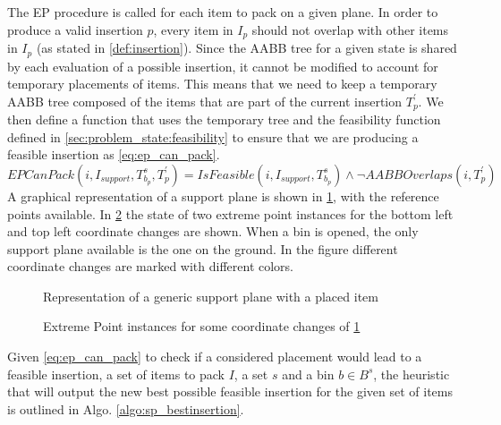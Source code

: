 The EP procedure is called for each item to pack on a given plane.
In order to produce a valid insertion $p$, every item in $I_p$ should not overlap with other items in $I_p$ (as stated in \cref{def:insertion}).
Since the AABB tree for a given state is shared by each evaluation of a possible insertion, it cannot be modified to account for temporary placements of items.
This means that we need to keep a temporary AABB tree composed of the items that are part of the current insertion $T^\prime_p$.
We then define a function that uses the temporary tree and the feasibility function defined in \cref{sec:problem_state:feasibility} to ensure that we are producing a feasible insertion as \cref{eq:ep_can_pack}.
\begin{equation}
    \label{eq:ep_can_pack}
    EPCanPack(i, I_{support}, T^s_{b_p}, T^\prime_p) = IsFeasible(i, I_{support}, T^s_{b_p}) \land \lnot AABBOverlaps(i, T^\prime_p)
\end{equation}
A graphical representation of a support plane is shown in \cref{fig:support_planes}, with the reference points available. In \cref{fig:ep_coordinate_changes} the state of two extreme point instances for the bottom left and top left coordinate changes are shown.
When a bin is opened, the only support plane available is the one on the ground.
In the figure different coordinate changes are marked with different colors.

\begin{figure}[hp]
    \centering
    \scalebox{0.9}{%
    
    }
    \caption{Representation of a generic support plane with a placed item}
    \label{fig:support_planes}
\end{figure}

\begin{figure}[hp]
    \centering
    
    \caption{Extreme Point instances for some coordinate changes of \cref{fig:support_planes}}
    \label{fig:ep_coordinate_changes}
\end{figure}

Given \cref{eq:ep_can_pack} to check if a considered placement would lead to a feasible insertion, a set of items to pack $I$, a set $s$ and a bin $b \in B^s$, the heuristic that will output the new best possible feasible insertion for the given set of items is outlined in Algo. \ref{algo:sp_bestinsertion}.




